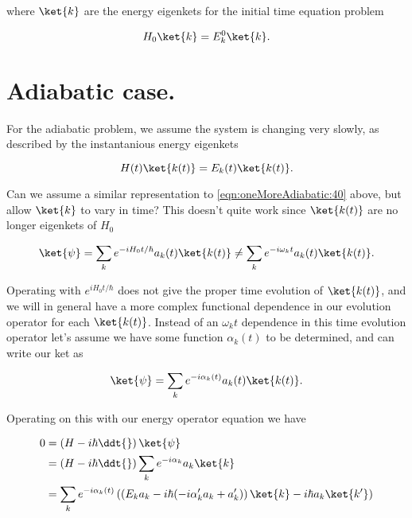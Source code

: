 where $\ket{k}$ are the energy eigenkets for the initial time equation problem

\begin{equation}\label{eqn:oneMoreAdiabatic:50}
H_0 \ket{k} = E_k^0 \ket{k}.
\end{equation}

\section{Adiabatic case.}

For the adiabatic problem, we assume the system is changing very slowly, as described by the instantanious energy eigenkets

\begin{equation}\label{eqn:oneMoreAdiabatic:60}
H(t) \ket{k(t)} = E_k(t) \ket{k(t)}.
\end{equation}

Can we assume a similar representation to \ref{eqn:oneMoreAdiabatic:40} above, but allow $\ket{k}$ to vary in time?  This doesn't quite work since $\ket{k(t)}$ are no longer eigenkets of $H_0$

\begin{equation}\label{eqn:oneMoreAdiabatic:10b}
\ket{\psi} 
= \sum_k e^{-i H_0 t/\hbar} a_k(t) \ket{k(t)}
\ne \sum_k e^{-i \omega_k t} a_k(t) \ket{k(t)}.
\end{equation}

Operating with $e^{i H_0 t/\hbar}$ does not give the proper time evolution of $\ket{k(t)}$, and we will in general have a more complex functional dependence in our evolution operator for each $\ket{k(t)}$.  Instead of an $\omega_k t$ dependence in this time evolution operator let's assume we have some function $\alpha_k(t)$ to be determined, and can write our ket as

\begin{equation}\label{eqn:oneMoreAdiabatic:70}
\ket{\psi} 
= \sum_k e^{-i \alpha_k(t)} a_k(t) \ket{k(t)}.
\end{equation}

Operating on this with our energy operator equation we have

\begin{align*}
0 
&=
\left(H - i \hbar \ddt{} \right) \ket{\psi} \\
&=
\left(H - i \hbar \ddt{} \right) \sum_k e^{-i \alpha_k} a_k \ket{k} \\
&=
\sum_k e^{-i \alpha_k(t)} 
\left( 
\left( 
E_k a_k
-i \hbar(-i \alpha_k' a_k + a_k')
\right) 
\ket{k}
-i \hbar
a_k \ket{k'}
\right) 
\\
\end{align*}

